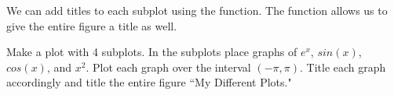 We can add titles to each subplot using the  function.
The  function allows us to give the entire figure a title as well.

\begin{problem}
Make a plot with 4 subplots.
In the subplots place graphs of $e^x$, $sin(x)$, $cos(x)$, and $x^2$.
Plot each graph over the interval $(-\pi,\pi)$.
Title each graph accordingly and title the entire figure ``My Different Plots."
\end{problem}

